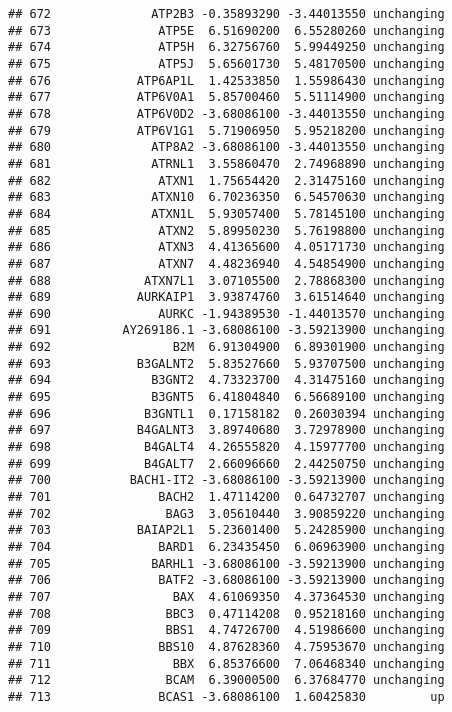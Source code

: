 \documentclass[]{article}
\begin{document}
\begin{verbatim}
## 672              ATP2B3 -0.35893290 -3.44013550 unchanging
## 673               ATP5E  6.51690200  6.55280260 unchanging
## 674               ATP5H  6.32756760  5.99449250 unchanging
## 675               ATP5J  5.65601730  5.48170500 unchanging
## 676            ATP6AP1L  1.42533850  1.55986430 unchanging
## 677            ATP6V0A1  5.85700460  5.51114900 unchanging
## 678            ATP6V0D2 -3.68086100 -3.44013550 unchanging
## 679            ATP6V1G1  5.71906950  5.95218200 unchanging
## 680              ATP8A2 -3.68086100 -3.44013550 unchanging
## 681              ATRNL1  3.55860470  2.74968890 unchanging
## 682               ATXN1  1.75654420  2.31475160 unchanging
## 683              ATXN10  6.70236350  6.54570630 unchanging
## 684              ATXN1L  5.93057400  5.78145100 unchanging
## 685               ATXN2  5.89950230  5.76198800 unchanging
## 686               ATXN3  4.41365600  4.05171730 unchanging
## 687               ATXN7  4.48236940  4.54854900 unchanging
## 688             ATXN7L1  3.07105500  2.78868300 unchanging
## 689            AURKAIP1  3.93874760  3.61514640 unchanging
## 690               AURKC -1.94389530 -1.44013570 unchanging
## 691          AY269186.1 -3.68086100 -3.59213900 unchanging
## 692                 B2M  6.91304900  6.89301900 unchanging
## 693            B3GALNT2  5.83527660  5.93707500 unchanging
## 694              B3GNT2  4.73323700  4.31475160 unchanging
## 695              B3GNT5  6.41804840  6.56689100 unchanging
## 696             B3GNTL1  0.17158182  0.26030394 unchanging
## 697            B4GALNT3  3.89740680  3.72978900 unchanging
## 698             B4GALT4  4.26555820  4.15977700 unchanging
## 699             B4GALT7  2.66096660  2.44250750 unchanging
## 700           BACH1-IT2 -3.68086100 -3.59213900 unchanging
## 701               BACH2  1.47114200  0.64732707 unchanging
## 702                BAG3  3.05610440  3.90859220 unchanging
## 703            BAIAP2L1  5.23601400  5.24285900 unchanging
## 704               BARD1  6.23435450  6.06963900 unchanging
## 705              BARHL1 -3.68086100 -3.59213900 unchanging
## 706               BATF2 -3.68086100 -3.59213900 unchanging
## 707                 BAX  4.61069350  4.37364530 unchanging
## 708                BBC3  0.47114208  0.95218160 unchanging
## 709                BBS1  4.74726700  4.51986600 unchanging
## 710               BBS10  4.87628360  4.75953670 unchanging
## 711                 BBX  6.85376600  7.06468340 unchanging
## 712                BCAM  6.39000500  6.37684770 unchanging
## 713               BCAS1 -3.68086100  1.60425830         up

\end{verbatim}
\end{document}

